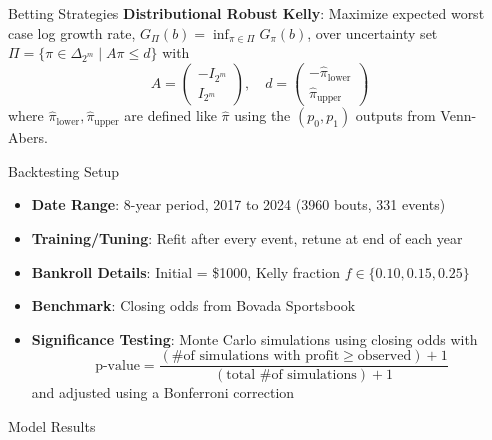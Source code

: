 \documentclass[final]{beamer}
\newlength{\colwidth}
\begin{document}
\begin{frame}[t]
\begin{columns}[t]
\begin{column}{\colwidth}
\begin{block}{Betting Strategies}
    \textbf{Distributional Robust Kelly}: Maximize expected worst case log growth rate, $G_{\Pi}(b) = \inf_{\pi \in \Pi} G_{\pi} (b)$, over uncertainty set $\Pi = \{\pi \in \Delta_{2^m} \mid A \pi \leq d \}$ with
    $$A = \begin{pmatrix}
        - I_{2^m} \\
        I_{2^m}
    \end{pmatrix}, \quad d = \begin{pmatrix}
        -\hat{\pi}_{\text{lower}} \\
        \hat{\pi}_{\text{upper}}
    \end{pmatrix}$$
    where $\hat{\pi}_{\text{lower}}, \hat{\pi}_{\text{upper}}$ are defined like $\hat{\pi}$ using the $(p_0, p_1)$ outputs from Venn-Abers.

  \end{block}
    \vspace{-20pt}
  \begin{block}{Backtesting Setup}

    \begin{itemize}
        \item \textbf{Date Range}: 8-year period, 2017 to 2024 (3960 bouts, 331 events)

        \item \textbf{Training/Tuning}: Refit after every event, retune at end of each year

        \item \textbf{Bankroll Details}: Initial = \$1000, Kelly fraction $f \in \{0.10, 0.15, 0.25\}$

        \item \textbf{Benchmark}: Closing odds from Bovada Sportsbook

        \item \textbf{Significance Testing}: Monte Carlo simulations using closing odds with
        $$\text{p-value} = \frac{(\text{\# of simulations with profit}\geq\text{observed}) + 1}{(\text{total \# of simulations}) + 1}$$
        and adjusted using a Bonferroni correction
    \end{itemize}

  \end{block}
    \vspace{-20pt}
  \begin{block}{Model Results}


\end{block}
\end{column}
\end{columns}
\end{frame}
\end{document}
